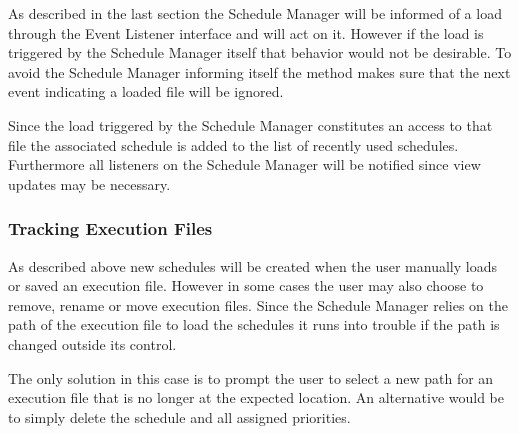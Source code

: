 As described in the last section the Schedule Manager will be informed of a load through the Event Listener
interface and will act on it. However if the load is triggered by the Schedule Manager itself that behavior
would not be desirable. To avoid the Schedule Manager informing itself the method makes sure that the next
event indicating a loaded file will be ignored.

Since the load triggered by the Schedule Manager constitutes an access to that file the associated schedule
is added to the list of recently used schedules. Furthermore all listeners on the Schedule Manager will
be notified since view updates may be necessary.


\subsubsection{Tracking Execution Files}
\label{section:TrackingExecutionFiles}
As described above new schedules will be created when the user manually loads or saved an execution file.
However in some cases the user may also choose to remove, rename or move execution files. Since the Schedule Manager
relies on the path of the execution file to load the schedules it runs into trouble if the path is changed outside
its control.

The only solution in this case is to prompt the user to select a new path for an execution file that is no
longer at the expected location. An alternative would be to simply delete the schedule and all assigned priorities.

\lstset{
backgroundcolor=,
}

